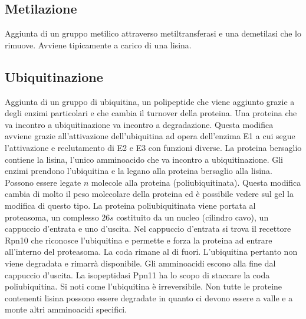 	\subsection{Metilazione}
	Aggiunta di un gruppo metilico attraverso metiltransferasi e una demetilasi che lo rimuove. 
	Avviene tipicamente a carico di una lisina.

	\subsection{Ubiquitinazione}
	Aggiunta di un gruppo di ubiquitina, un polipeptide che viene aggiunto grazie a degli enzimi particolari e che cambia il turnover della proteina. Una proteina che va incontro a 
	ubiquitinazione va incontro a degradazione. Questa modifica avviene grazie all'attivazione dell'ubiquitina ad opera dell'enzima E1 a cui segue l'attivazione e reclutamento di E2 e E3 con
	funzioni diverse. La proteina bersaglio contiene la lisina, l'unico amminoacido che va incontro a ubiquitinazione. Gli enzimi prendono l'ubiquitina e la legano alla proteina bersaglio
	alla lisina. Possono essere legate $n$ molecole alla proteina (poliubiquitinata). Questa modifica cambia di molto il peso molecolare della proteina ed \`e possibile vedere sul gel la
	modifica di questo tipo. La proteina poliubiquitinata viene portata al proteasoma, un complesso $26s$ costituito da un nucleo (cilindro cavo), un cappuccio d'entrata e uno d'uscita. Nel
	cappuccio d'entrata si trova il recettore Rpn10 che riconosce l'ubiquitina e permette e forza la proteina ad entrare all'interno del proteasoma. La coda rimane al di fuori. L'ubiquitina 
	pertanto non viene degradata e rimarr\`a disponibile. Gli amminoacidi escono alla fine dal cappuccio d'uscita. La isopeptidasi Ppn11 ha lo scopo di staccare la coda poliubiquitina. 
	Si noti come l'ubiquitina \`e irreversibile. Non tutte le proteine contenenti lisina possono essere degradate in quanto ci devono essere a valle e a monte altri amminoacidi specifici. 

